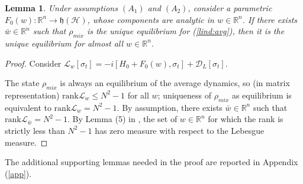 \documentclass[conference]{IEEEtran}
\theoremstyle{plain}
\theoremstyle{plain}
\theoremstyle{plain}
\newtheorem{lem}[theorem]{Lemma}
\theoremstyle{plain}
\theoremstyle{remark}
\theoremstyle{definition}
\begin{document}
\begin{lem}
    Under assumptions $(A_1)$ and $(A_2)$, consider a parametric $F_0(w) : \mathbb R^n \rightarrow \mathfrak h(\mathcal H)$, whose components are analytic in $w \in \mathbb R^n$. If there exists $\bar w \in \mathbb R^n$ such that $\rho_{mix}$ is the unique equilibrium for (\ref{lind:avg}), then it is the unique equilibrium for almost all $w \in \mathbb R^n$. 
\end{lem} \begin{proof}
    Consider $\mathscr L_w[\sigma_t] = -i[H_0 + F_0(w), \sigma_t] + \mathcal D_L[\sigma_t].$
    
    The state $\rho_{mix}$ is always an equilibrium of the average dynamics, so (in matrix representation) $\mathrm {rank}\mathscr L_w \le N^2 - 1$ for all $w$; uniqueness of $\rho_{mix}$ as equilibrium is equivalent to $\mathrm {rank } \mathscr L_w = N^2 - 1$.
    By assumption, there exists $\bar w \in \mathbb R^n$ such that $\mathrm{rank } \mathscr L_{\bar w} = N^2 - 1$. By Lemma (5) in \cite{zeromeas}, the set of $w \in \mathbb R^n$ for which the rank is strictly less than $N^2 - 1$ has zero measure with respect to the Lebesgue measure.
\end{proof}

The additional supporting lemmas needed in the proof are reported in Appendix (\ref{app}).
\end{document}
